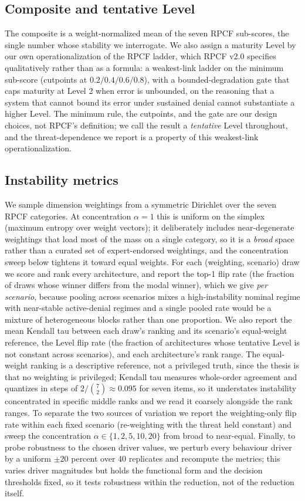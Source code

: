 \documentclass[conference]{IEEEtran}
\begin{document}
\subsection{Composite and tentative Level}
The composite is a weight-normalized mean of the seven RPCF sub-scores, the single number whose stability we interrogate. We also assign a maturity Level by our own operationalization of the RPCF ladder, which RPCF v2.0 specifies qualitatively rather than as a formula: a weakest-link ladder on the minimum sub-score (cutpoints at $0.2/0.4/0.6/0.8$), with a bounded-degradation gate that caps maturity at Level 2 when error is unbounded, on the reasoning that a system that cannot bound its error under sustained denial cannot substantiate a higher Level. The minimum rule, the cutpoints, and the gate are our design choices, not RPCF's definition; we call the result a \emph{tentative} Level throughout, and the threat-dependence we report is a property of this weakest-link operationalization.

\subsection{Instability metrics}
We sample dimension weightings from a symmetric Dirichlet over the seven RPCF categories. At concentration $\alpha=1$ this is uniform on the simplex (maximum entropy over weight vectors); it deliberately includes near-degenerate weightings that load most of the mass on a single category, so it is a \emph{broad} space rather than a curated set of expert-endorsed weightings, and the concentration sweep below tightens it toward equal weights. For each (weighting, scenario) draw we score and rank every architecture, and report the top-1 flip rate (the fraction of draws whose winner differs from the modal winner), which we give \emph{per scenario}, because pooling across scenarios mixes a high-instability nominal regime with near-stable active-denial regimes and a single pooled rate would be a mixture of heterogeneous blocks rather than one proportion. We also report the mean Kendall tau \cite{kendall} between each draw's ranking and its scenario's equal-weight reference, the Level flip rate (the fraction of architectures whose tentative Level is not constant across scenarios), and each architecture's rank range. The equal-weight ranking is a descriptive reference, not a privileged truth, since the thesis is that no weighting is privileged; Kendall tau measures whole-order agreement and quantizes in steps of $2/\binom{7}{2}\approx0.095$ for seven items, so it understates instability concentrated in specific middle ranks and we read it coarsely alongside the rank ranges. To separate the two sources of variation we report the weighting-only flip rate within each fixed scenario (re-weighting with the threat held constant) and sweep the concentration $\alpha\in\{1,2,5,10,20\}$ from broad to near-equal. Finally, to probe robustness to the chosen driver values, we perturb every behaviour driver by a uniform $\pm 20$ percent over 40 replicates and recompute the metrics; this varies driver magnitudes but holds the functional form and the decision thresholds fixed, so it tests robustness within the reduction, not of the reduction itself.
\end{document}
